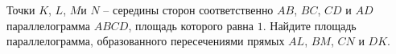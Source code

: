 \begin{ex}
	\begin{condition}
		Точки \( K \), \( L \), \( M  \)и \( N \) – середины сторон соответственно \( AB \), \( BC \), \( CD  \) и \( AD  \) параллелограмма \( ABCD \), площадь которого равна \( 1 \). Найдите площадь параллелограмма, образованного пересечениями прямых \( AL \), \( BM \), \( CN  \) и \( DK \).
	\end{condition}
\end{ex}